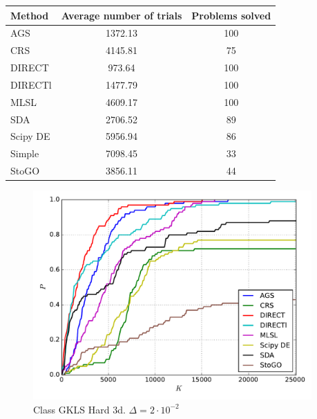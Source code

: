 \documentclass[a4paper]{article}
\begin{document}
\begin{tabular}{lcc}
\hline
 Method   &  Average number of trials  &  Problems solved  \\
\hline
 AGS      &          1372.13           &        100        \\
 CRS      &          4145.81           &        75         \\
 DIRECT   &           973.64           &        100        \\
 DIRECTl  &          1477.79           &        100        \\
 MLSL     &          4609.17           &        100        \\
 SDA      &          2706.52           &        89         \\
 Scipy DE &          5956.94           &        86         \\
 Simple   &          7098.45           &        33         \\
 StoGO    &          3856.11           &        44         \\
\hline
\end{tabular}
\begin{figure}[H]
  \center
  \includegraphics[width=0.95\textwidth]{../experiments/gklsh3d/cmc.pdf}
  \caption{Class GKLS Hard 3d. $\Delta=2\cdot10^{-2}$}
\end{figure}
\end{document}
